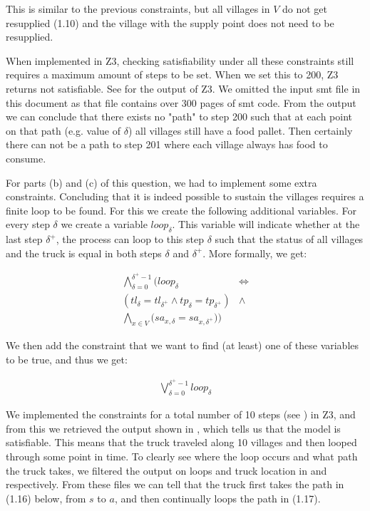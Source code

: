 This is similar to the previous constraints, but all villages in $V$ do not get resupplied (1.10) and the village with the supply point does not need to be resupplied.

When implemented in Z3, checking satisfiability under all these constraints still requires a maximum amount of steps to be set. When we set this to 200, Z3 returns not satisfiable. See  for the output of Z3. We omitted the input smt file in this document as that file contains over 300 pages of smt code. From the output we can conclude that there exists no "path" to step 200 such that at each point on that path (e.g. value of $\delta$) all villages still have a food pallet. Then certainly there can not be a path to step 201 where each village always has food to consume. 

For parts (b) and (c) of this question, we had to implement some extra constraints. Concluding that it is indeed possible to sustain the villages requires a finite loop to be found. For this we create the following additional variables. For every step $\delta$ we create a variable $loop_{\delta}$. This variable will indicate whether at the last step $\delta^{+}$, the process can loop to this step $\delta$ such that the status of all villages and the truck is equal in both steps $\delta$ and $\delta^{+}$. More formally, we get:

\begin{align}
    \bigwedge^{\delta^{+} - 1}_{\delta=0}\bigg(loop_{\delta} & \Longleftrightarrow \\
    (tl_{\delta} = tl_{\delta^{+}} \wedge tp_{\delta} = tp_{\delta^{+}}) & \wedge \\
    \bigwedge_{x \in V}\big(sa_{x,\delta} = sa_{x,\delta^{+}}\big)\bigg)
\end{align}

We then add the constraint that we want to find (at least) one of these variables to be true, and thus we get:

\begin{align}
    \bigvee^{\delta^{+} - 1}_{\delta=0} loop_{\delta}
\end{align}

We implemented the constraints for a total number of 10 steps (see ) in Z3, and from this we retrieved the output shown in , which tells us that the model is satisfiable. This means that the truck traveled along 10 villages and then looped through some point in time. To clearly see where the loop occurs and what path the truck takes, we filtered the output on loops and truck location in  and  respectively. From these files we can tell that the truck first takes the path in (1.16) below, from $s$ to $a$, and then continually loops the path in (1.17).


